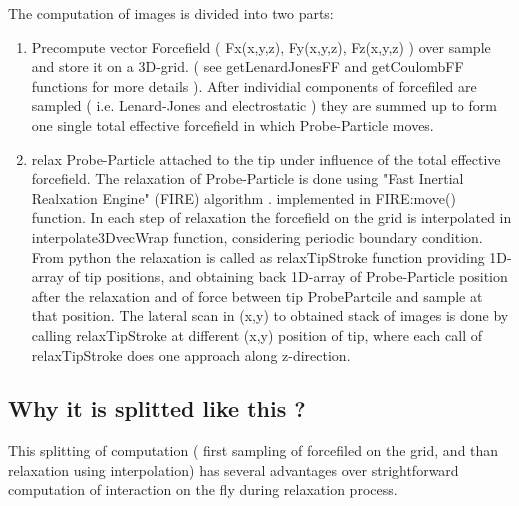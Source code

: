 The computation of images is divided into two parts:
\begin{enumerate}
    \item Precompute vector Forcefield ( Fx(x,y,z), Fy(x,y,z), Fz(x,y,z) ) over
    sample and store it on a 3D-grid. ( see getLenardJonesFF and getCoulombFF
    functions for more details ). After individial components of forcefiled are
    sampled ( i.e. Lenard-Jones and electrostatic ) they are summed up to form
    one single total effective forcefield in which Probe-Particle moves.
    
    \item relax Probe-Particle attached to the tip under influence of the total
    effective forcefield. The relaxation of Probe-Particle is done using "Fast
    Inertial Realxation Engine" (FIRE) algorithm
    \cite{ebitzekstructrelaxmadesimple}. implemented in
    FIRE:move() function. In each step of relaxation the forcefield on the grid
    is interpolated in interpolate3DvecWrap function, considering periodic
    boundary condition. From python the relaxation is called as relaxTipStroke
    function providing 1D-array of tip positions, and obtaining back 1D-array of
    Probe-Particle position after the relaxation and of force between tip
    ProbePartcile and sample at that position. The lateral scan in (x,y) to
    obtained stack of images is done by calling relaxTipStroke at different
    (x,y) position of tip, where each call of relaxTipStroke does one approach
    along z-direction.

\end{enumerate}

\subsection{Why it is splitted like this ?}

This splitting of computation ( first sampling of forcefiled on the grid, and
than relaxation using interpolation) has several advantages over strightforward
computation of interaction on the fly during relaxation process.


